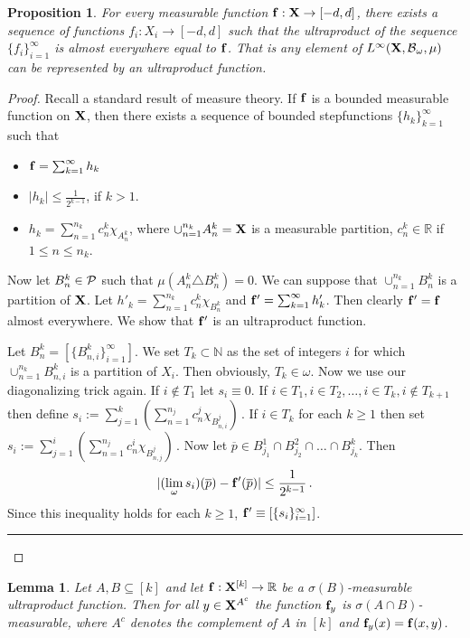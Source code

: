 \documentclass [11pt] {article}
\newcommand{\qed} {\hspace {0.1in} \rule {1.5mm} {3.5mm}}
\newtheorem{lemma}{Lemma}[section]
\newtheorem{proposition}{Proposition}[section]
\def\limo{\lim_{\omega}}
\def\bR{{\mathbb R}}
\def\bN{{\mathbb N}}\def\bQ{{\mathbb Q}}
\def\cB{\mbox{$\cal B$}}
\def\cB{\mbox{$\cal B$}}
\def\cP{\mbox{$\cal P$}}
\def\to{\rightarrow}
\def\xo{{\bf X}}
\def\bo{\cB_\omega}
\def\muo{\mu}
\def\xok{\xo^{[k]}}
\def\ac{A^c}
\def\fb{{\bf f}}
\begin{document}
\begin{proposition}\label{tetel2}
For every measurable function $\fb:\xo\to[-d,d]$, there exists a sequence
of functions $f_i:X_i\to [-d,d]$ such that
the ultraproduct of the sequence $\{f_i\}_{i=1}^\infty$ is
almost everywhere equal to $\fb$. That is any element of
$L^\infty(\xo,\bo,\muo)$ can be represented by an ultraproduct function.
\end{proposition}
\begin{proof}
Recall a standard result of measure theory. If $\fb$ is a bounded measurable
function on $\xo$, then there exists a sequence of bounded
stepfunctions $\{h_k\}^\infty_{k=1}$ such that
\begin{itemize}
\item
$\fb=\sum^\infty_{k=1} h_k$
\item  $|h_k|\leq \frac{1}{2^{k-1}}$, if $k>1$.
\item $h_k=\sum^{n_k}_{n=1} c^k_n \chi_{A^k_n}$, where
$\cup^{n_k}_{n=1}A^k_n=\xo$ is a
measurable partition, $c^k_n\in\bR$ if $1\leq n \leq n_k$.
\end{itemize}
Now let $B^k_n\in\cP$ such that $\muo(A^k_n\triangle B^k_n)=0$.
We can suppose that $\cup^{n_k}_{n=1} B^k_n$ is a partition of $\xo$.
Let $h'_k=\sum^{n_k}_{n=1} c^k_n \chi_{B^k_n}$ and
$\fb'=\sum^\infty_{k=1} h'_k$.
Then clearly $\fb'=\fb$ almost everywhere. 
We show that $\fb'$ is an ultraproduct
function.

\noindent
Let $B^k_n=[\{B^k_{n,i}\}^\infty_{i=1}]$.
We set $T_k\subset \bN$ as the set of integers $i$ for which
$\cup_{n=1}^{n_k} B^k_{n,i}$ is a partition of $X_i$. Then obviously,
$T_k\in\omega$.
Now we use our diagonalizing trick again. If $i\notin T_1$ let $s_i\equiv 0$.
If $i\in T_1, i\in T_2,\dots,i\in T_k, i\notin T_{k+1}$ then
define $s_i:=\sum^k_{j=1}(\sum^{n_j}_{n=1} c^j_n \chi_{B^j_{n,i}})\,.$
If $i\in T_k$ for each $k\geq 1$ then set
$s_i:=\sum^i_{j=1}(\sum^{n_j}_{n=1} c^i_n \chi_{B^j_{n,j}})\,.$
Now let $\overline{p}\in B^1_{j_1}\cap B^2_{j_2}\cap\dots\cap B^k_{j_k}$.
Then
$$|(\limo s_i)(\overline{p})-\fb'(\overline{p})|\leq\frac{1}{2^{k-1}}\,.$$
Since this inequality holds for each $k\geq 1$, $\fb'\equiv
[\{s_i\}^\infty_{i=1}]$. \qed
\end{proof} \vskip 0.2in
\begin{lemma}
\label{l14}
\label{vetites} Let $A,B\subseteq [k]$ and
let $\fb:\xok\to\mathbb{R}$ be a $\sigma(B)$-measurable ultraproduct
 function.
 Then for all $y\in \xo^{\ac}$ the function
$\fb_y$ is $\sigma(A\cap B)$-measurable, where $\ac$ denotes
the complement of $A$ in $[k]$ and $\fb_y(x)=\fb(x,y)$.
\end{lemma}
\end{document}
